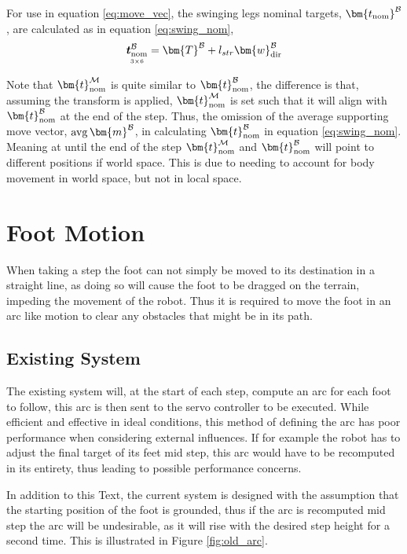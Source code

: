         For use in equation \ref{eq:move_vec}, the swinging legs nominal targets, \(\bm{t_\text{nom}} ^\fbody\), are calculated as 
        in equation \ref{eq:swing_nom},
        \begin{equation} \label{eq:swing_nom}
            \mdim{\boldsymbol{t}_\text{nom}^\fbody}{3}{6} = \bm{T}^\fbody + l_{str}\bm{w}_\text{dir}^\fbody
        \end{equation}

        Note that \(\bm{t}_\text{nom}\inrefframe{M}\) is quite similar to \(\bm{t}_\text{nom}^\fbody\), the difference is that, 
        assuming the  transform is applied, \(\bm{t}_\text{nom}\inrefframe{M}\) is set such that it
        will align with \(\bm{t}_\text{nom}^\fbody\)
        at the end of the step. Thus, the omission of the average supporting move vector, \(\avg \bm{m}^\fbody\), in calculating \(\bm{t}_\text{nom}^\fbody\)
        in equation \ref{eq:swing_nom}.
        Meaning at until the end of the step \(\bm{t}_\text{nom}\inrefframe{M}\) and \(\bm{t}_\text{nom}^\fbody\) will point 
        to different positions if world space. This is due to needing to account for body movement in world space, but not in local space.


    \section{Foot Motion} \label{sec:arc_generation}
    When taking a step the foot can not simply be moved to its destination in a straight line, as doing so will cause the foot to be dragged on the terrain,
    impeding the movement of the robot. Thus it is required to move the foot in an arc like motion to clear any obstacles that might be in its path.


    \subsection{Existing System}
        The existing system will, at the start of each step, compute an arc for each foot to follow, this arc is then sent to the servo controller
        to be executed. While efficient and effective in ideal conditions, this method of defining the arc has poor performance when considering external
        influences. If for example the robot has to adjust the final target of its feet mid step, this arc would have to be recomputed in its entirety,
        thus leading to possible performance concerns.

        In addition to this Text, the current system is designed with the assumption that the starting position of the foot is grounded, thus if the arc is recomputed
        mid step the arc will be undesirable, as it will rise with the desired step height for a second time. This is illustrated in Figure \ref{fig:old_arc}.

